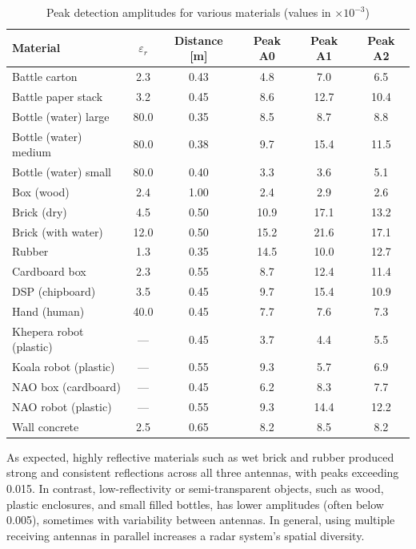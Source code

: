 \begin{table}[H]
\renewcommand{\arraystretch}{0.5} %
\centering
\small
\caption{Peak detection amplitudes for various materials (values in $\times 10^{-3}$)}
\begin{tabular}{@{}lccccc@{}}
\toprule
\textbf{Material} & $\varepsilon_r$ & \textbf{Distance [m]} & \textbf{Peak A0} & \textbf{Peak A1} & \textbf{Peak A2} \\
\midrule
Battle carton             & 2.3  & 0.43 & 4.8   & 7.0   & 6.5 \\
Battle paper stack        & 3.2  & 0.45 & 8.6   & 12.7  & 10.4 \\
Bottle (water) large      & 80.0 & 0.35 & 8.5   & 8.7   & 8.8 \\
Bottle (water) medium     & 80.0 & 0.38 & 9.7   & \cellcolor{myred}15.4 & 11.5 \\
Bottle (water) small      & 80.0 & 0.40 & \cellcolor{myblue}3.3 & 3.6   & \cellcolor{myblue}5.1 \\
Box (wood)                & 2.4  & 1.00 & 2.4   & 2.9   & \cellcolor{myred}2.6 \\
Brick (dry)               & 4.5  & 0.50 & 10.9  & 17.1  & 13.2 \\
Brick (with water)               & 12.0 & 0.50 & \cellcolor{myred}15.2 & \cellcolor{myred}21.6 & 17.1 \\
Rubber                    & 1.3  & 0.35 & 14.5  & 10.0  & 12.7 \\
Cardboard box  & 2.3  & 0.55 & 8.7   & 12.4  & 11.4 \\
DSP (chipboard)           & 3.5  & 0.45 & 9.7   & 15.4  & 10.9 \\
Hand (human)              & 40.0 & 0.45 & 7.7   & 7.6   & 7.3 \\
Khepera robot (plastic)   & —    & 0.45 & \cellcolor{myblue}3.7 & 4.4   & 5.5 \\
Koala robot (plastic)     & —    & 0.55 & 9.3   & 5.7   & 6.9 \\
NAO box (cardboard)       & —    & 0.45 & 6.2   & 8.3   & 7.7 \\
NAO robot (plastic)       & —    & 0.55 & 9.3   & 14.4  & 12.2 \\
Wall concrete             & 2.5  & 0.65 & 8.2   & 8.5   & 8.2 \\
\bottomrule
\end{tabular}
\label{tab:material_peaks_clean}
\end{table}

As expected, highly reflective materials such as wet brick and rubber produced strong and consistent reflections across all three antennas, with peaks exceeding 0.015. In contrast, low-reflectivity or semi-transparent objects, such as wood, plastic enclosures, and small filled bottles, has lower amplitudes (often below 0.005), sometimes with variability between antennas. In general, using multiple receiving antennas in parallel increases a radar system's spatial diversity.



